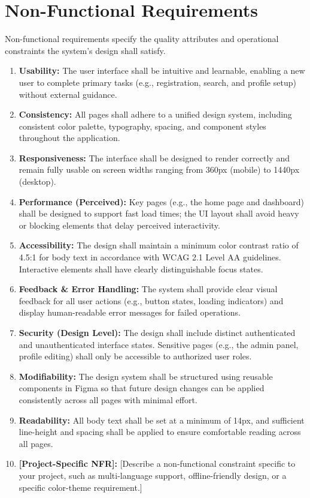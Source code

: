 \documentclass[12pt, a4paper]{article}
\begin{document}
\section{Non-Functional Requirements}

Non-functional requirements specify the quality attributes and operational constraints the system's design shall satisfy.

\begin{enumerate}[label=\textbf{NFR-\arabic*:}, leftmargin=*, align=left]
    \item \textbf{Usability:} The user interface shall be intuitive and learnable, enabling a new user to complete primary tasks (e.g., registration, search, and profile setup) without external guidance.
    \item \textbf{Consistency:} All pages shall adhere to a unified design system, including consistent color palette, typography, spacing, and component styles throughout the application.
    \item \textbf{Responsiveness:} The interface shall be designed to render correctly and remain fully usable on screen widths ranging from 360px (mobile) to 1440px (desktop).
    \item \textbf{Performance (Perceived):} Key pages (e.g., the home page and dashboard) shall be designed to support fast load times; the UI layout shall avoid heavy or blocking elements that delay perceived interactivity.
    \item \textbf{Accessibility:} The design shall maintain a minimum color contrast ratio of 4.5:1 for body text in accordance with WCAG 2.1 Level AA guidelines. Interactive elements shall have clearly distinguishable focus states.
    \item \textbf{Feedback \& Error Handling:} The system shall provide clear visual feedback for all user actions (e.g., button states, loading indicators) and display human-readable error messages for failed operations.
    \item \textbf{Security (Design Level):} The design shall include distinct authenticated and unauthenticated interface states. Sensitive pages (e.g., the admin panel, profile editing) shall only be accessible to authorized user roles.
    \item \textbf{Modifiability:} The design system shall be structured using reusable components in Figma so that future design changes can be applied consistently across all pages with minimal effort.
    \item \textbf{Readability:} All body text shall be set at a minimum of 14px, and sufficient line-height and spacing shall be applied to ensure comfortable reading across all pages.
    \item \textbf{[Project-Specific NFR]:} [Describe a non-functional constraint specific to your project, such as multi-language support, offline-friendly design, or a specific color-theme requirement.]
\end{enumerate}
\end{document}
